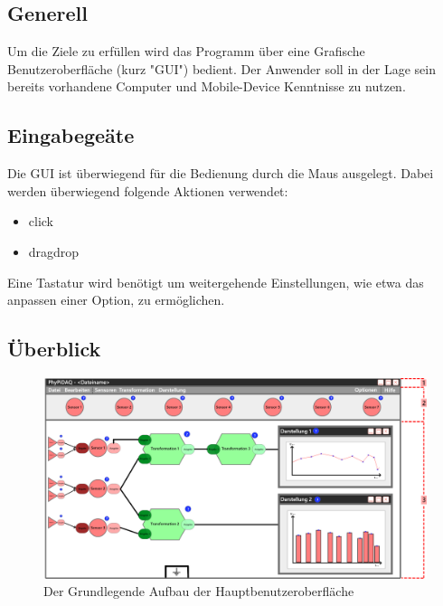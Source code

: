 \documentclass[parskip=full]{scrartcl}
\begin{document}
\subsection{Generell}

Um die Ziele zu erfüllen wird das Programm über eine Grafische Benutzeroberfläche (kurz "GUI") bedient. Der Anwender soll in der Lage sein bereits vorhandene Computer und Mobile-Device Kenntnisse zu nutzen.

\subsection{Eingabegeäte}

Die GUI ist überwiegend für die Bedienung durch die Maus ausgelegt. Dabei werden überwiegend folgende Aktionen verwendet:

\begin{itemize} 
	\item \gls{click}
	\item \gls{dragdrop}
\end{itemize}

Eine Tastatur wird benötigt um weitergehende Einstellungen, wie etwa das anpassen einer Option, zu ermöglichen.



\subsection{Überblick}

\begin{figure}[h]
	\begin{center}
		\includegraphics[width = 15cm]{Grafik/GUI-mit-Segmenten.png}
		\caption{Der Grundlegende Aufbau der Hauptbenutzeroberfläche}
		\label{GUI_Grundlage}
	\end{center}
\end{figure}
\end{document}
